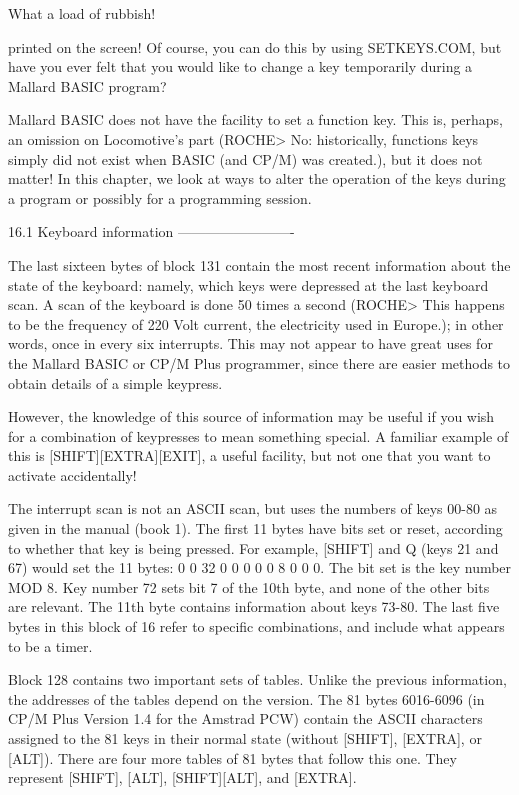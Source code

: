         What a load of rubbish!

printed  on the screen! Of course, you can do this by using  SETKEYS.COM,  but 
have  you ever felt that you would like to change a key temporarily  during  a 
Mallard BASIC program?

Mallard  BASIC  does  not have the facility to set a function  key.  This  is, 
perhaps, an omission on Locomotive's part (ROCHE> No: historically,  functions 
keys simply did not exist when BASIC (and CP/M) was created.), but it does not 
matter!  In this chapter, we look at ways to alter the operation of  the  keys 
during a program or possibly for a programming session.


16.1 Keyboard information
-------------------------

The last sixteen bytes of block 131 contain the most recent information  about 
the  state  of  the keyboard: namely, which keys were depressed  at  the  last 
keyboard  scan. A scan of the keyboard is done 50 times a second (ROCHE>  This 
happens  to  be  the frequency of 220 Volt current, the  electricity  used  in 
Europe.); in other words, once in every six interrupts. This may not appear to 
have great uses for the Mallard BASIC or CP/M Plus programmer, since there are 
easier methods to obtain details of a simple keypress.

However, the knowledge of this source of information may be useful if you wish 
for a combination of keypresses to mean something special. A familiar  example 
of this is [SHIFT][EXTRA][EXIT], a useful facility, but not one that you  want 
to activate accidentally!

The interrupt scan is not an ASCII scan, but uses the numbers of keys 00-80 as 
given  in  the  manual (book 1). The first 11 bytes have bits  set  or  reset, 
according  to  whether that key is being pressed. For example, [SHIFT]  and  Q 
(keys 21 and 67) would set the 11 bytes: 0 0 32 0 0 0 0 0 8 0 0 0. The bit set 
is  the key number MOD 8. Key number 72 sets bit 7 of the 10th byte, and  none 
of the other bits are relevant. The 11th byte contains information about  keys 
73-80. The last five bytes in this block of 16 refer to specific combinations, 
and include what appears to be a timer.

Block  128  contains  two  important  sets  of  tables.  Unlike  the  previous 
information,  the addresses of the tables depend on the version. The 81  bytes 
6016-6096  (in  CP/M Plus Version 1.4 for the Amstrad PCW) contain  the  ASCII 
characters  assigned  to the 81 keys in their normal state  (without  [SHIFT], 
[EXTRA],  or [ALT]). There are four more tables of 81 bytes that  follow  this 
one. They represent [SHIFT], [ALT], [SHIFT][ALT], and [EXTRA].

